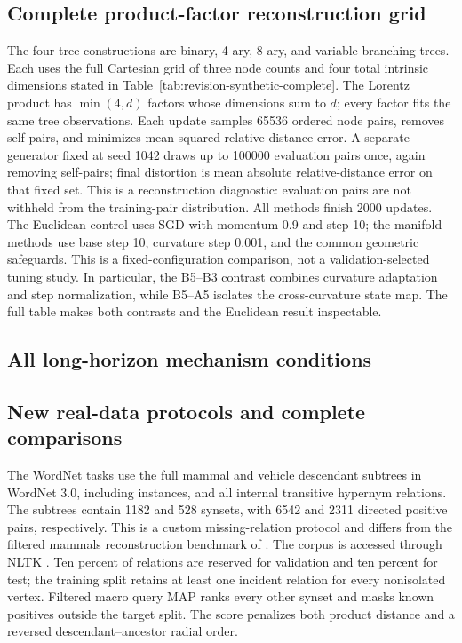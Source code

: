 \subsection{Complete product-factor reconstruction grid}
\label{app:complete-product-grid}
The four tree constructions are binary, 4-ary, 8-ary, and variable-branching trees. Each uses the full Cartesian grid of three node counts and four total intrinsic dimensions stated in Table~\ref{tab:revision-synthetic-complete}. The Lorentz product has $\min(4,d)$ factors whose dimensions sum to $d$; every factor fits the same tree observations. Each update samples 65536 ordered node pairs, removes self-pairs, and minimizes mean squared relative-distance error. A separate generator fixed at seed 1042 draws up to 100000 evaluation pairs once, again removing self-pairs; final distortion is mean absolute relative-distance error on that fixed set. This is a reconstruction diagnostic: evaluation pairs are not withheld from the training-pair distribution. All methods finish 2000 updates. The Euclidean control uses SGD with momentum 0.9 and step 10; the manifold methods use base step 10, curvature step 0.001, and the common geometric safeguards. This is a fixed-configuration comparison, not a validation-selected tuning study. In particular, the B5--B3 contrast combines curvature adaptation and step normalization, while B5--A5 isolates the cross-curvature state map. The full table makes both contrasts and the Euclidean result inspectable.


\subsection{All long-horizon mechanism conditions}



\subsection{New real-data protocols and complete comparisons}
The WordNet tasks use the full mammal and vehicle descendant subtrees in WordNet 3.0, including instances, and all internal transitive hypernym relations. The subtrees contain 1182 and 528 synsets, with 6542 and 2311 directed positive pairs, respectively. This is a custom missing-relation protocol and differs from the filtered mammals reconstruction benchmark of \citet{nickel2017poincare}. The corpus is accessed through NLTK \citep{nltkwordnet}. Ten percent of relations are reserved for validation and ten percent for test; the training split retains at least one incident relation for every nonisolated vertex. Filtered macro query MAP ranks every other synset and masks known positives outside the target split. The score penalizes both product distance and a reversed descendant--ancestor radial order.

